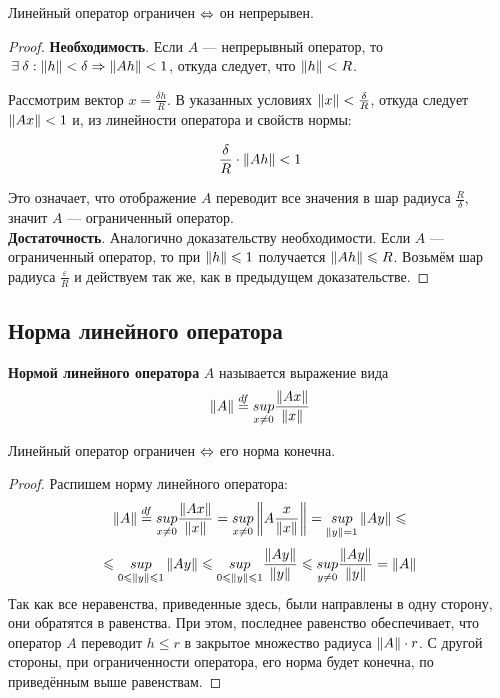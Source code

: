 	\begin{state}
		Линейный оператор ограничен $\Leftrightarrow$ он непрерывен.
	\end{state}
	\begin{proof}
		\textbf{Необходимость}. Если $A$ --- непрерывный оператор, то 
		$ \exists \delta : \norm{h} < \delta \Rightarrow \norm{Ah} < 1 $,
		откуда следует, что $\left\| h \right\| < R$. 
		
		Рассмотрим вектор $x = \frac{\delta h}{R}$. В указанных условиях
		$\left\| x \right\| < \frac{\delta}{R}$, откуда следует $\left\| Ax \right\| < 1$ и, из линейности оператора и свойств нормы:

		$$\frac{\delta}{R} \cdot \left\| Ah \right\| < 1$$
		
		Это означает, что отображение $A$ переводит все значения в шар радиуса $\frac{R}{\delta}$, значит
		$A$ --- ограниченный оператор. \\
		
		\textbf{Достаточность}. Аналогично доказательству необходимости. Если $A$ --- ограниченный оператор,
		то при $\left\| h \right\| \leqslant 1$ получается $\left\| Ah \right\| \leqslant R$. Возьмём шар радиуса $\frac{\varepsilon}{R}$
		и действуем так же, как в предыдущем доказательстве.
	\end{proof}
	
	\subsection{Норма линейного оператора}
	
	\begin{defi}
		\textbf{Нормой линейного оператора} $A$ называется выражение вида 
		$$\left\| A \right\| \overset{df}{=} \underset{x \neq 0}{sup} \frac{\left\| Ax \right\|}{\left\| x \right\|}$$
	\end{defi}
	
	\begin{state}
		Линейный оператор ограничен $\Leftrightarrow$ его норма конечна.
	\end{state}
	\begin{proof}
		Распишем норму линейного оператора:
		$$
			\left\| A \right\| \overset{df}{=} \underset{x \neq 0}{sup} \frac{\left\| Ax \right\|}{\left\| x \right\|} = 
			\underset{x \neq 0}{sup} \left\| A \frac{x}{\left\| x \right\|} \right\| =
			\underset{\left\| y \right\| = 1}{sup} \left\| Ay \right\| \leqslant
		$$
		$$
			\leqslant
			\underset{0 \leqslant \left\| y \right\| \leqslant 1}{sup} \left\| Ay \right\| \leqslant
			\underset{0 \leqslant \left\| y \right\| \leqslant 1}{sup} \frac{\left\| Ay \right\|}{\left\| y \right\|} \leqslant
			\underset{y \neq 0}{sup} \frac{\left\| Ay \right\|}{\left\| y \right\|} =
			\left\| A \right\|
		$$
		Так как все неравенства, приведенные здесь, были направлены в одну сторону,
		они обратятся в равенства. При этом, последнее равенство обеспечивает, что
		оператор $A$ переводит $h \leq r$ в закрытое множество радиуса $\left\| A \right\| \cdot r$.
		С другой стороны, при ограниченности оператора, его норма будет конечна, по приведённым
		выше равенствам.
	\end{proof}
	
